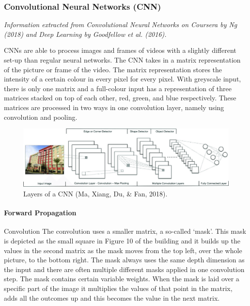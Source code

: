 \subsubsection*{Convolutional Neural Networks (CNN)}
\textit{Information extracted from Convolutional Neural Networks on Coursera by Ng (2018) and Deep Learning by Goodfellow et al. (2016).}

CNNs are able to process images and frames of videos with a slightly different set-up than regular neural networks. The CNN takes in a matrix representation of the picture or frame of the video. The matrix representation stores the intensity of a certain colour in every pixel for every pixel. With greyscale input, there is only one matrix and a full-colour input has a representation of three matrices stacked on top of each other, red, green, and blue respectively. These matrices are processed in two ways in one convolution layer, namely using convolution and pooling. 

\begin{figure}[ht]
	\includegraphics[width=\textwidth]{fig10.png} 
	\caption{Layers of a CNN (Ma, Xiang, Du, \& Fan, 2018).}
\end{figure}

\paragraph{Forward Propagation}
Convolution
The convolution uses a smaller matrix, a so-called \lq mask\rq . This mask is depicted as the small square in Figure 10 of the building and it builds up the values in the second matrix as the mask moves from the top left, over the whole picture, to the bottom right. The mask always uses the same depth dimension as the input and there are often multiple different masks applied in one convolution step. The mask contains certain variable weights. When the mask is laid over a specific part of the image it multiplies the values of that point in the matrix, adds all the outcomes up and this becomes the value in the next matrix. 


